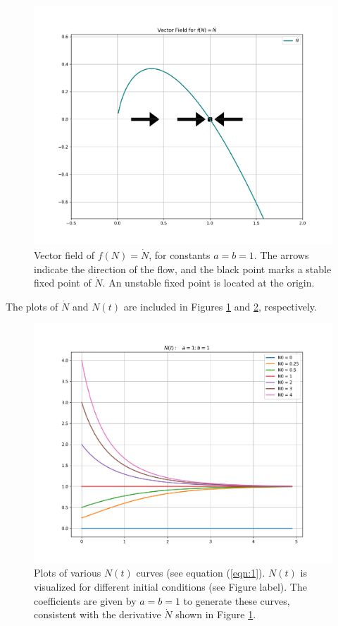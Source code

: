 \documentclass[draft]{agujournal2019}
\begin{document}
\begin{figure}
    \centering
    \includegraphics[width=0.65\linewidth]{figures/1D_vector_field_f.png}
    \caption{Vector field of $f(N) = \dot N$, for constants $a=b=1$. The arrows indicate the direction of the flow, and the black point marks a stable fixed point of $\dot N$. An unstable fixed point is located at the origin.}
    \label{fig:1}
\end{figure}

The plots of $\dot N$ and $N(t)$ are included in Figures \ref{fig:1} and \ref{fig:2}, respectively.


\begin{figure}
    \centering
    \includegraphics[width=1.\linewidth]{figures/plot_Ns.png}
    \caption{Plots of various $N(t)$ curves (see equation (\ref{eqn:1}). $N(t)$ is visualized for different initial conditions (see Figure label). The coefficients are given by $a=b=1$ to generate these curves, consistent with the derivative $\dot N$ shown in Figure \ref{fig:1}. }
    \label{fig:2}
\end{figure}
\end{document}
